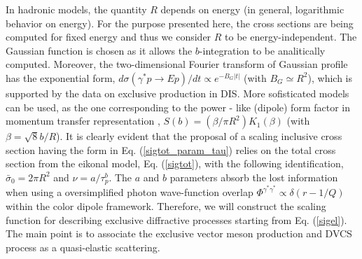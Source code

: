 \documentclass[twocolumn,showpacs,preprintnumbers,amsmath,amssymb,showkeys,aps,prd,a4paper,byrevtex]{revtex4}
\begin{document}
In hadronic models, the quantity $R$ depends on energy (in general, logarithmic behavior on energy). For the purpose presented here, the cross sections are being computed for fixed energy and thus we consider $R$ to be energy-independent. The Gaussian function is chosen as it allows  the $b$-integration to be analitically computed. Moreover, the two-dimensional Fourier transform of Gaussian profile has the exponential form, $d\sigma (\gamma^*p\rightarrow Ep)/dt\propto e^{-B_G|t|}$ (with $B_G \simeq  R^2$), which is supported by the data on exclusive production in DIS. More sofisticated models can be used, as the one corresponding to the power - like (dipole) form factor in momentum transfer representation \cite{GLM}, $S(b) = (\beta/\pi R^2)K_1(\beta)$ (with $\beta = \sqrt{8}b/R$).  It is clearly evident that the proposal of a scaling inclusive cross section having the form in Eq. (\ref{sigtot_param_tau}) relies on the total cross section from the eikonal model, Eq. (\ref{sigtot}), with the following identification, $\bar{\sigma}_0 = 2\pi R^2$ and $\nu = a/\tau_p^b$. The $a$ and $b$ parameters absorb the lost information when using a oversimplified photon wave-function overlap $\Phi^{\gamma^*\gamma^*}\propto \delta \left(r-1/Q\right)$ within the color dipole framework. Therefore, we will construct the scaling function for describing exclusive diffractive processes starting from Eq. (\ref{sigel}). The main point is to associate the exclusive vector meson production and DVCS process as a quasi-elastic scattering.
\end{document}
